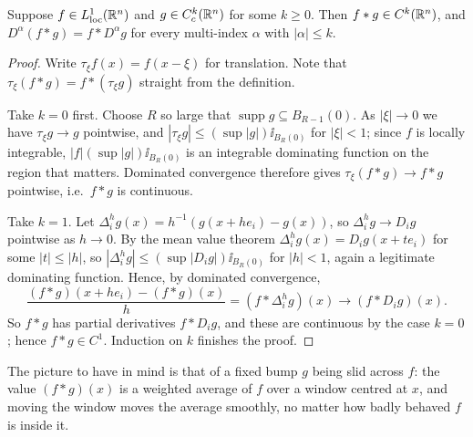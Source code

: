 \documentclass[a4paper]{scrartcl}
\DeclareMathOperator{\supp}{supp}
\newcommand{\bumppath}{plot coordinates {
	(-1,0) (-0.95,0.0001) (-0.9,0.0141) (-0.85,0.0740) (-0.8,0.1691)
	(-0.75,0.2657) (-0.7,0.3825) (-0.65,0.4788) (-0.6,0.5698)
	(-0.55,0.6482) (-0.5,0.7165) (-0.45,0.7756) (-0.4,0.8266)
	(-0.35,0.8700) (-0.3,0.9057) (-0.25,0.9349) (-0.2,0.9594)
	(-0.15,0.9779) (-0.1,0.9900) (-0.05,0.9975) (0,1)
	(0.05,0.9975) (0.1,0.9900) (0.15,0.9779) (0.2,0.9594)
	(0.25,0.9349) (0.3,0.9057) (0.35,0.8700) (0.4,0.8266)
	(0.45,0.7756) (0.5,0.7165) (0.55,0.6482) (0.6,0.5698)
	(0.65,0.4788) (0.7,0.3825) (0.75,0.2657) (0.8,0.1691)
	(0.85,0.0740) (0.9,0.0141) (0.95,0.0001) (1,0)}}
\begin{document}
\begin{theorem}\label{thm:convsmooth}
	Suppose $f \in L^1_{\mathrm{loc}}(\mathbb{R}^n)$ and $g \in C^k_c(\mathbb{R}^n)$ for some $k \ge 0$. Then $f * g \in C^k(\mathbb{R}^n)$, and $D^\alpha(f*g) = f * D^\alpha g$ for every multi-index $\alpha$ with $|\alpha| \le k$.
\end{theorem}

\begin{proof}
	Write $\tau_\xi f(x) = f(x - \xi)$ for translation. Note that $\tau_\xi(f*g) = f * (\tau_\xi g)$ straight from the definition.

	Take $k = 0$ first. Choose $R$ so large that $\supp g \subseteq B_{R-1}(0)$. As $|\xi| \to 0$ we have $\tau_\xi g \to g$ pointwise, and $|\tau_\xi g| \le (\sup |g|) \ii_{B_R(0)}$ for $|\xi| < 1$; since $f$ is locally integrable, $|f| (\sup|g|)\ii_{B_R(0)}$ is an integrable dominating function on the region that matters. Dominated convergence therefore gives $\tau_\xi (f * g) \to f*g$ pointwise, i.e.\ $f * g$ is continuous.

	Take $k = 1$. Let $\Delta^h_i g(x) = h^{-1}(g(x + he_i) - g(x))$, so $\Delta^h_i g \to D_i g$ pointwise as $h \to 0$. By the mean value theorem $\Delta^h_i g(x) = D_i g(x + te_i)$ for some $|t| \le |h|$, so $|\Delta^h_i g| \le (\sup |D_i g|)\ii_{B_R(0)}$ for $|h| < 1$, again a legitimate dominating function. Hence, by dominated convergence,
	$$\frac{(f*g)(x + he_i) - (f*g)(x)}{h} = (f * \Delta^h_i g)(x) \longrightarrow (f * D_i g)(x).$$
	So $f * g$ has partial derivatives $f * D_i g$, and these are continuous by the case $k=0$; hence $f*g \in C^1$. Induction on $k$ finishes the proof.
\end{proof}

The picture to have in mind is that of a fixed bump $g$ being slid across $f$: the value $(f * g)(x)$ is a weighted average of $f$ over a window centred at $x$, and moving the window moves the average smoothly, no matter how badly behaved $f$ is inside it.

\begin{center}
\end{center}
\end{document}
